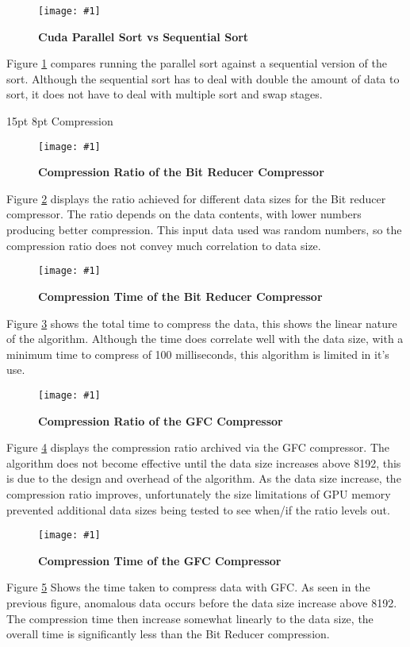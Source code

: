\documentclass[12pt,a4paper]{article}
\makeatletter
\newcommand{\figuremacroWHHN}[3]{
	\begin{figure}[H] %
		\centering
		\texttt{[image: \#1]}
		\caption[#2]{\textbf{#2}}
		\label{fig:#1}
	\end{figure}
}
\newcommand{\figuremacroWHN}[3]{
	\begin{figure}[h!] %
		\centering
		\texttt{[image: \#1]}
		\caption[#2]{\textbf{#2}}
		\label{fig:#1}
	\end{figure}
}
\renewcommand\subsection{\@startsection {subsection}{1}{2mm} %
                               {15pt} %
                               {8pt} %
                               {\fontsize{13pt}{1em}\bfseries}}
\makeatother
\begin{document}
\figuremacroWHHN
{cudagpusort}
{Cuda Parallel Sort vs Sequential Sort}
{1.0}

Figure \ref{fig:cudagpusort} compares running the parallel sort against a sequential version of the sort. Although the sequential sort has to deal with double the amount of data to sort, 
it does not have to deal with multiple sort and swap stages.
\clearpage

\subsection{Compression}
\figuremacroWHN
{BitCompressRatio}
{Compression Ratio of the Bit Reducer Compressor}
{1.0}

Figure \ref{fig:BitCompressRatio} displays the ratio achieved for different data sizes for the Bit reducer compressor. The ratio depends on the data contents, with lower numbers producing better compression. This input data used was random numbers, so the compression ratio does not convey much correlation to data size.

\figuremacroWHHN
{BitCompressTime}
{Compression Time of the Bit Reducer Compressor}
{1.0}

Figure \ref{fig:BitCompressTime} shows the total time to compress the data, this shows the linear nature of the algorithm. Although the time does correlate well with the data size, with a minimum time to compress of 100 milliseconds, this algorithm is limited in it's use.

\figuremacroWHN
{GFCcompressionRatio}
{Compression Ratio of the GFC Compressor}
{1.0}

Figure \ref{fig:GFCcompressionRatio} displays the compression ratio archived via the GFC compressor. The algorithm does not become effective until the data size increases above 8192, this is due to the design and overhead of the algorithm. As the data size increase, the compression ratio improves, unfortunately the size limitations of GPU memory prevented additional data sizes being tested to see when/if the ratio levels out.

\figuremacroWHN
{GFCCompressionTime}
{Compression Time of the GFC Compressor}
{1.0}

Figure \ref{fig:GFCCompressionTime} Shows the time taken to compress data with GFC. As seen in the previous figure, anomalous data occurs before the data size increase above 8192. The compression time then increase somewhat linearly to the data size, the overall time is significantly less than the Bit Reducer compression.
\end{document}
